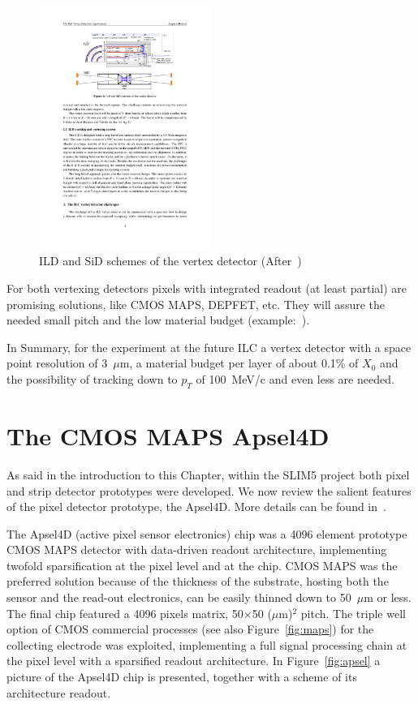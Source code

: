 \begin{figure}
\centering
\includegraphics[width=0.5\textwidth]{ILC_concepts.pdf}
\caption{\label{fig:ILC_concepts}ILD and SiD schemes of the vertex detector (After~\cite{ILCVertexing2016})}
\end{figure}

For both vertexing detectors pixels with integrated readout (at least partial) are promising solutions, 
like CMOS MAPS, DEPFET, etc. They will assure the needed small pitch and the low material 
budget (example:~\cite{mimosa26}). 

In Summary, for the experiment at the future ILC a vertex detector with a space point resolution of 
3~$\mu$m, a material budget per layer of about 0.1\% of $X_0$ and the possibility  of    
tracking down to $p_T$ of 100~MeV/c and even less are needed.



\section{The CMOS MAPS Apsel4D}
\label{sec:Apsel4D}

As said in the introduction to this Chapter, within the SLIM5 project both pixel and strip detector
prototypes were developed. We now review the salient features of the pixel 
detector prototype, the Apsel4D. More details can be found in~\cite{BETTARINI2010942,NERI2010195}.

The Apsel4D (active pixel sensor electronics) chip was a 4096 element prototype CMOS MAPS 
detector with 
data-driven readout architecture, implementing twofold sparsification at the pixel level and at the chip. 
CMOS MAPS was the preferred solution because of the thickness of the substrate, hosting both the 
sensor and the read-out electronics, can be easily thinned down to 50~$\mu$m or less. 
The final chip featured a 4096 pixels matrix, 50$\times$50 ($\mu$m)$^2$ pitch. 
  The triple well option of CMOS commercial processes (see also Figure~\ref{fig:maps}) for the collecting electrode was exploited, implementing a full signal processing chain at the pixel level with a sparsified readout architecture. 
In Figure~\ref{fig:apsel} a picture of the Apsel4D chip is presented, together with a scheme of its architecture readout.

